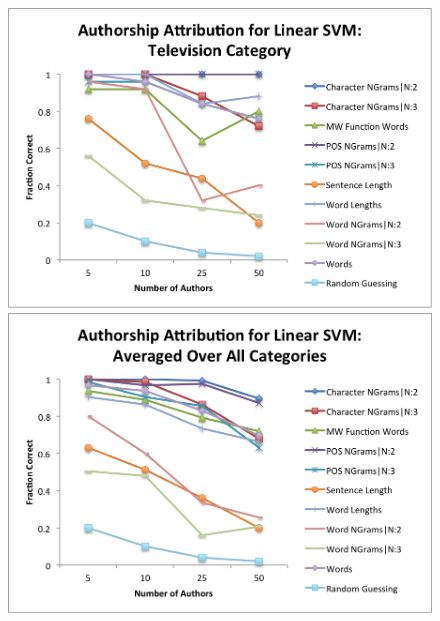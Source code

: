\documentclass[pageno]{jpaper}
\begin{document}
\begin{figure}[h!]
\begin{center}
\includegraphics*[scale=.75]{SVMTelevision}
\includegraphics*[scale=.75]{SVMAll}
\end{center}
\label{fig:SVMCategories3}
\end{figure}
\end{document}
